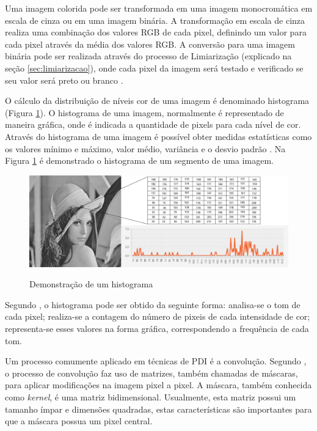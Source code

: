 \documentclass[
	12pt,				%
	oneside,			%
	a4paper,			%
	english,			%
	french,				%
	spanish,			%
	brazil,				%
	]{abntex2}
\begin{document}
Uma imagem colorida pode ser transformada em uma imagem monocromática em escala de cinza ou em uma imagem binária. A transformação em escala de cinza realiza uma combinação dos valores RGB de cada pixel, definindo um valor para cada pixel através da média dos valores RGB. A conversão para uma imagem binária pode ser realizada através do processo de Limiarização (explicado na seção \ref{sec:limiarizacao}), onde cada pixel da imagem será testado e verificado se seu valor será preto ou branco \cite{mossmann2010extraccao}.

O cálculo da distribuição de níveis cor de uma imagem é denominado histograma (Figura \ref{fig:histograma}). O histograma de uma imagem, normalmente é representado de maneira gráfica, onde é indicada a quantidade de pixels para cada nível de cor. Através do histograma de uma imagem é possível obter medidas estatísticas como os valores mínimo e máximo, valor médio, variância e o desvio padrão \cite{gonzalesWoods:2008}. Na Figura \ref{fig:histograma} é demonstrado o histograma de um segmento de uma imagem. 

\begin{figure}[ht]
\centering
\caption{Demonstração de um histograma}
\includegraphics[width=1\textwidth]{imagens/histograma.png}
\label{fig:histograma}
\sourceAuthor
\end{figure}

Segundo \citet{conciAzevedoLeta:2008}, o histograma pode ser obtido da seguinte forma: analisa-se o tom de cada pixel; realiza-se a contagem do número de pixeis de cada intensidade de cor; representa-se esses valores na forma gráfica, correspondendo a frequência de cada tom.

Um processo comumente aplicado em técnicas de PDI é a convolução. Segundo \citet{pedriniSchwartz:2008}, o processo de convolução faz uso de matrizes, também chamadas de máscaras, para aplicar modificações na imagem pixel a pixel. A máscara, também conhecida como \textit{kernel}, é uma matriz bidimensional. Usualmente, esta matriz possui um tamanho ímpar e dimensões quadradas, estas características são importantes para que a máscara possua um pixel central.
\end{document}

